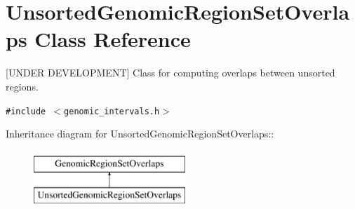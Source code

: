 \hypertarget{classUnsortedGenomicRegionSetOverlaps}{
\section{UnsortedGenomicRegionSetOverlaps Class Reference}
\label{classUnsortedGenomicRegionSetOverlaps}
}
\mbox{[}UNDER DEVELOPMENT\mbox{]} Class for computing overlaps between unsorted regions.  


{\tt \#include $<$genomic\_\-intervals.h$>$}

Inheritance diagram for UnsortedGenomicRegionSetOverlaps::\begin{figure}[H]
\begin{center}
\leavevmode
\includegraphics[height=2cm]{classUnsortedGenomicRegionSetOverlaps}
\end{center}
\end{figure}
